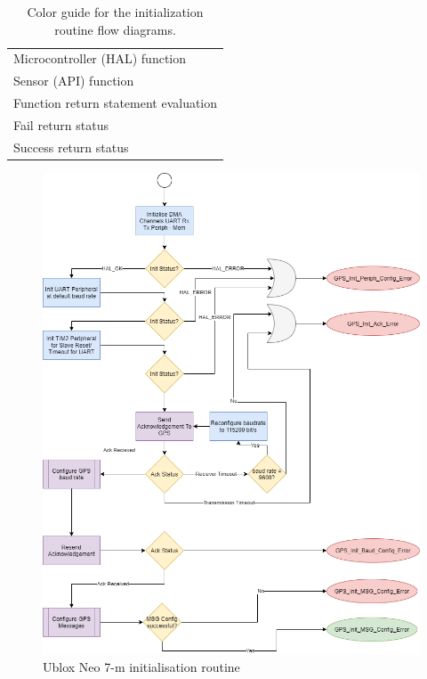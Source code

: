 \begin{table}[H]
    \centering
    \caption{Color guide for the initialization routine flow diagrams.}
    \begin{tabular}{l}
    \hline
       \cellcolor{micro}Microcontroller (HAL) function \\
        \cellcolor{sensor}Sensor (API) function \\
        \cellcolor{conditional}Function return statement evaluation \\
        \cellcolor{wrong}Fail return status \\
        \cellcolor{succ}Success return status\\
        \hline
    \end{tabular}

    \label{tab:Init_routine_Guide}
\end{table}


\begin{figure}[H]
    \centering
    \includegraphics[scale=0.3]{GPS Initialization Algorithm .png}
    \caption{Ublox Neo 7-m initialisation routine}
    \label{fig:Init_diagram_gps}
\end{figure}

